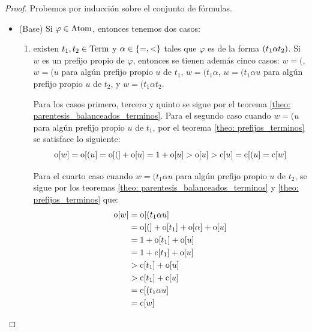 \begin{agregado}

\begin{proof}
	Probemos por inducción sobre el conjunto de fórmulas.
	\begin{itemize}
		\item (Base) Si $\varphi\in\ATOMICAS$, entonces tenemos dos casos:
		\begin{enumerate}
			\item existen $t_{1}, t_{2}\in\TERMINOS$ y $\alpha\in\set*{=, <}$ tales que $\varphi$ es de la forma $\pa*{t_{1}\alpha t_{2}}$. Si $w$ es un prefijo propio de $\varphi$, entonces se tienen además cinco casos: $w = ($, $w = (u$ para algún prefijo propio $u$ de $t_{1}$, $w = (t_{1}\alpha$, $w = (t_{1}\alpha u$ para algún prefijo propio $u$ de $t_{2}$, y $w = (t_{1}\alpha t_{2}$.

			Para los casos primero, tercero y quinto se sigue por el teorema \ref{theo: parentesis_balanceados_terminos}. Para el segundo caso cuando $w = (u$ para algún prefijo propio $u$ de $t_{1}$, por el teorema \ref{theo: prefijos_terminos} se satisface lo siguiente:
			\[
				\ABIERTO\bra*{w} =\ABIERTO\bra*{(u} =\ABIERTO\bra*{(} +\ABIERTO\bra*{u} = 1 +\ABIERTO\bra*{u} >\ABIERTO\bra*{u} >\CERRADO\bra*{u} =\CERRADO\bra*{(u} =\CERRADO\bra*{w}
			\]

			Para el cuarto caso cuando $w = (t_{1}\alpha u$ para algún prefijo propio $u$ de $t_{2}$, se sigue por los teoremas \ref{theo: parentesis_balanceados_terminos} y \ref{theo: prefijos_terminos} que:
			\begin{align*}
				\ABIERTO\bra*{w} &=\ABIERTO\bra*{(t_{1}\alpha u}\\
				&=\ABIERTO\bra*{(} +\ABIERTO\bra*{t_{1}} +\ABIERTO\bra*{\alpha} +\ABIERTO\bra*{u}\\
				&= 1 +\ABIERTO\bra*{t_{1}} +\ABIERTO\bra*{u}\\
				&= 1 +\CERRADO\bra*{t_{1}} +\ABIERTO\bra*{u}\\
				&>\CERRADO\bra*{t_{1}} +\ABIERTO\bra*{u}\\
				&>\CERRADO\bra*{t_{1}} +\CERRADO\bra*{u}\\
				&=\CERRADO\bra*{(t_{1}\alpha u}\\
				&=\CERRADO\bra*{w}
			\end{align*}


\end{enumerate}
\end{itemize}
\end{proof}
\end{agregado}
